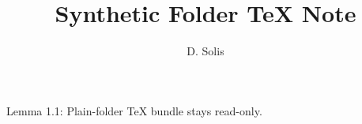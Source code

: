 \documentclass{article}
\title{Synthetic Folder TeX Note}
\author{D. Solis}
\begin{document}
Lemma 1.1: Plain-folder TeX bundle stays read-only.
\end{document}
